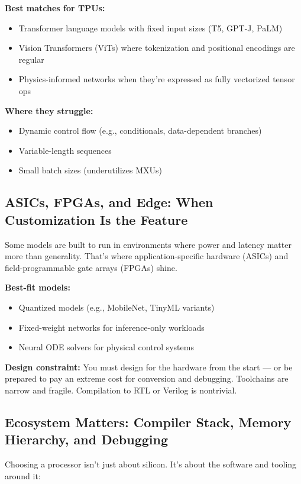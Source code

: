\textbf{Best matches for TPUs:}
\begin{itemize}
    \item Transformer language models with fixed input sizes (T5, GPT-J, PaLM)
    \item Vision Transformers (ViTs) where tokenization and positional encodings are regular
    \item Physics-informed networks when they're expressed as fully vectorized tensor ops
\end{itemize}

\textbf{Where they struggle:}
\begin{itemize}
    \item Dynamic control flow (e.g., conditionals, data-dependent branches)
    \item Variable-length sequences
    \item Small batch sizes (underutilizes MXUs)
\end{itemize}

\subsection{ASICs, FPGAs, and Edge: When Customization Is the Feature}

Some models are built to run in environments where power and latency matter more than generality. That’s where application-specific hardware (ASICs) and field-programmable gate arrays (FPGAs) shine.

\textbf{Best-fit models:}
\begin{itemize}
    \item Quantized models (e.g., MobileNet, TinyML variants)
    \item Fixed-weight networks for inference-only workloads
    \item Neural ODE solvers for physical control systems
\end{itemize}

\textbf{Design constraint:}  
You must design for the hardware from the start — or be prepared to pay an extreme cost for conversion and debugging. Toolchains are narrow and fragile. Compilation to RTL or Verilog is nontrivial.

\subsection{Ecosystem Matters: Compiler Stack, Memory Hierarchy, and Debugging}

Choosing a processor isn't just about silicon. It's about the software and tooling around it:


